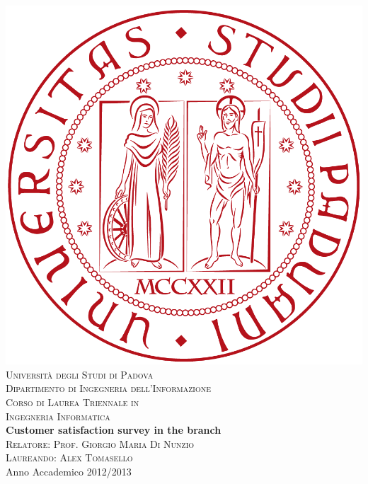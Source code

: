 



\begin{titlepage}
\begin{center}
\includegraphics[scale=0.08]{logo.png}\\[1.5cm]
\textsc{\LARGE Università degli Studi di Padova}\\[1.2cm]
\textsc{\Large Dipartimento di Ingegneria dell'Informazione}\\[0.8cm]
\textsc{\Large Corso di Laurea Triennale in}\\[0.5cm]
\textsc{\Large Ingegneria Informatica}\\[2cm]
{ \LARGE \bfseries Customer satisfaction survey in the branch}\\[2cm]
\textsc{\large Relatore: Prof. Giorgio Maria Di Nunzio}\\[0.5cm]
\textsc{\large Laureando: Alex Tomasello}\\
\vfill
{\large Anno Accademico 2012/2013}
\end{center}
\end{titlepage}


\thispagestyle{empty} %
\cleardoublepage


